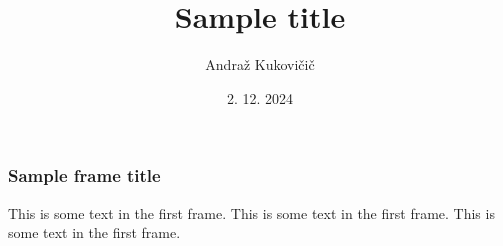 \documentclass{beamer}
\title{Sample title}
\author{Andraž Kukovičič}
\institute{Fakulteta za matematiko in fiziko}
\date{2. 12. 2024}
\begin{document}
\frame{\titlepage}

\begin{frame}
\frametitle{Sample frame title}
This is some text in the first frame. This is some text in the first frame. This is some text in the first frame.
\end{frame}
\end{document}
